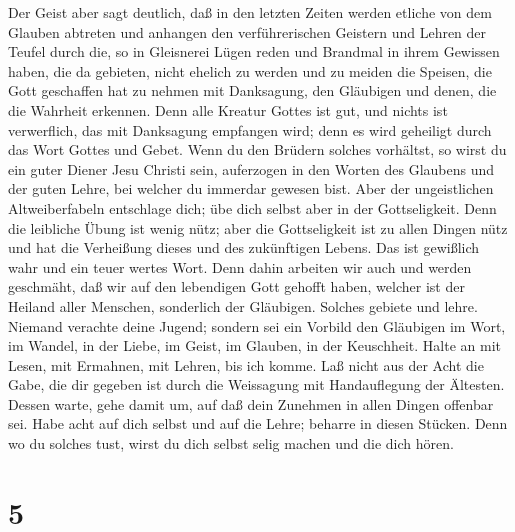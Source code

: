  Der Geist aber sagt deutlich, daß in den letzten Zeiten
werden etliche von dem Glauben abtreten und anhangen den verführerischen
Geistern und Lehren der Teufel  durch die, so in Gleisnerei
Lügen reden und Brandmal in ihrem Gewissen haben,  die da
gebieten, nicht ehelich zu werden und zu meiden die Speisen, die Gott
geschaffen hat zu nehmen mit Danksagung, den Gläubigen und denen, die
die Wahrheit erkennen.  Denn alle Kreatur Gottes ist gut,
und nichts ist verwerflich, das mit Danksagung empfangen wird;
 denn es wird geheiligt durch das Wort Gottes und Gebet.
 Wenn du den Brüdern solches vorhältst, so wirst du ein
guter Diener Jesu Christi sein, auferzogen in den Worten des Glaubens
und der guten Lehre, bei welcher du immerdar gewesen bist. 
Aber der ungeistlichen Altweiberfabeln entschlage dich; übe dich selbst
aber in der Gottseligkeit.  Denn die leibliche Übung ist
wenig nütz; aber die Gottseligkeit ist zu allen Dingen nütz und hat die
Verheißung dieses und des zukünftigen Lebens.  Das ist
gewißlich wahr und ein teuer wertes Wort.  Denn dahin
arbeiten wir auch und werden geschmäht, daß wir auf den lebendigen Gott
gehofft haben, welcher ist der Heiland aller Menschen, sonderlich der
Gläubigen.  Solches gebiete und lehre. 
Niemand verachte deine Jugend; sondern sei ein Vorbild den Gläubigen im
Wort, im Wandel, in der Liebe, im Geist, im Glauben, in der Keuschheit.
 Halte an mit Lesen, mit Ermahnen, mit Lehren, bis ich
komme.  Laß nicht aus der Acht die Gabe, die dir gegeben
ist durch die Weissagung mit Handauflegung der Ältesten. 
Dessen warte, gehe damit um, auf daß dein Zunehmen in allen Dingen
offenbar sei.  Habe acht auf dich selbst und auf die Lehre;
beharre in diesen Stücken. Denn wo du solches tust, wirst du dich selbst
selig machen und die dich hören.

\hypertarget{section-4}{%
\section{5}\label{section-4}}

